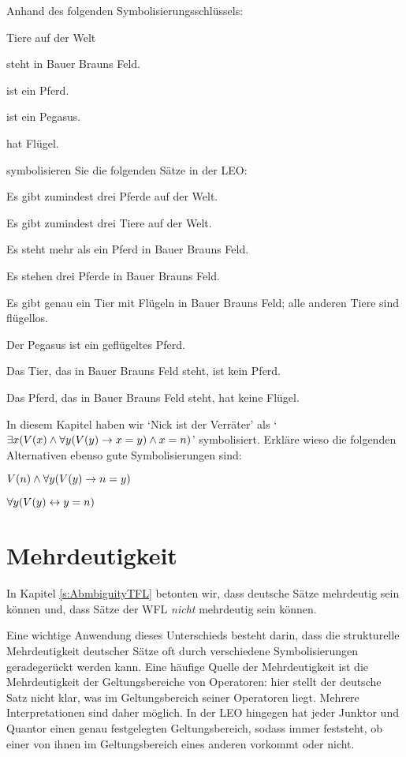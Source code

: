 \problempart 
Anhand des folgenden Symbolisierungsschlüssels:
\begin{ekey}
\item[\text{Domäne}] Tiere auf der Welt
\item[\atom{B}{x}]  steht in Bauer Brauns Feld.
\item[\atom{P_1}{x}]  ist ein Pferd.
\item[\atom{P_2}{x}]  ist ein Pegasus.
\item[\atom{F}{x}]  hat Flügel.
\end{ekey}
symbolisieren Sie die folgenden Sätze in der LEO:
\begin{earg}
\item Es gibt zumindest drei Pferde auf der Welt.
\item Es gibt zumindest drei Tiere auf der Welt.
\item Es steht mehr als ein Pferd in Bauer Brauns Feld.
\item Es stehen drei Pferde in Bauer Brauns Feld.
\item Es gibt genau ein Tier mit Flügeln in Bauer Brauns Feld; alle anderen Tiere sind flügellos.
\item Der Pegasus ist ein geflügeltes Pferd.
\item Das Tier, das in Bauer Brauns Feld steht, ist kein Pferd.
\item Das Pferd, das in Bauer Brauns Feld steht, hat keine Flügel.
\end{earg}

\problempart
In diesem Kapitel haben wir `Nick ist der Verräter' als `$\exists x (\mathord{V}(x) \wedge \forall y(\mathord{V}(y) \rightarrow x = y) \wedge x = n)$' symbolisiert. Erkläre wieso die folgenden Alternativen ebenso gute Symbolisierungen sind:
	\begin{ebullet}
		\item $\mathord{V}(n) \wedge \forall y(\mathord{V}(y) \rightarrow n = y)$
		\item $\forall y(\mathord{V}(y) \leftrightarrow y = n)$
	\end{ebullet}


\chapter{Mehrdeutigkeit}

In Kapitel \ref{s:AbmbiguityTFL} betonten wir, dass deutsche Sätze mehrdeutig sein können und, dass Sätze der WFL \emph{nicht} mehrdeutig sein können. 

Eine wichtige Anwendung dieses Unterschieds besteht darin, dass die strukturelle Mehrdeutigkeit deutscher Sätze oft durch verschiedene Symbolisierungen geradegerückt werden kann. Eine häufige Quelle der Mehrdeutigkeit ist die Mehrdeutigkeit der Geltungsbereiche von Operatoren: hier stellt der deutsche Satz nicht klar, was im Geltungsbereich seiner Operatoren liegt. Mehrere Interpretationen sind daher möglich. In der LEO hingegen hat jeder Junktor und Quantor einen genau festgelegten Geltungsbereich, sodass immer feststeht, ob einer von ihnen im Geltungsbereich eines anderen vorkommt oder nicht.

